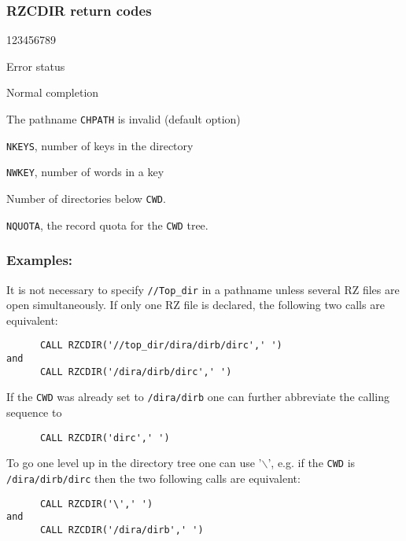 \subsubsection*{RZCDIR return codes}

\begin{DLtt}{123456789}
\item[IQUEST(1)]Error status
\begin{DLtt}{1}
\item[0]Normal completion
\item[1]The pathname {\tt CHPATH} is invalid (default option)
\end{DLtt}
\item[IQUEST(7)]{\tt NKEYS}, number of keys in the directory
\item[IQUEST(8)]{\tt NWKEY}, number of words in a key
\item[IQUEST(9)]Number of directories below {\tt CWD}.
\item[IQUEST(10)]{\tt NQUOTA}, the record quota for the {\tt CWD} tree.
\end{DLtt}

\subsubsection*{Examples:}

It is not necessary to specify {\tt //Top\_dir} in a pathname
unless several RZ files are open simultaneously.
If only one RZ file is declared, the following two calls
are equivalent:

\begin{verbatim}
      CALL RZCDIR('//top_dir/dira/dirb/dirc',' ')
and
      CALL RZCDIR('/dira/dirb/dirc',' ')
\end{verbatim}

If the {\tt CWD} was already set to {\tt /dira/dirb}
one can further abbreviate
the calling sequence to

\begin{verbatim}
      CALL RZCDIR('dirc',' ')
\end{verbatim}

To go one level up in the directory tree one can use '$\backslash$', e.g.
if the {\tt CWD} is {\tt /dira/dirb/dirc}
then the two following calls are equivalent:

\begin{verbatim}
      CALL RZCDIR('\',' ')
and
      CALL RZCDIR('/dira/dirb',' ')
\end{verbatim}

